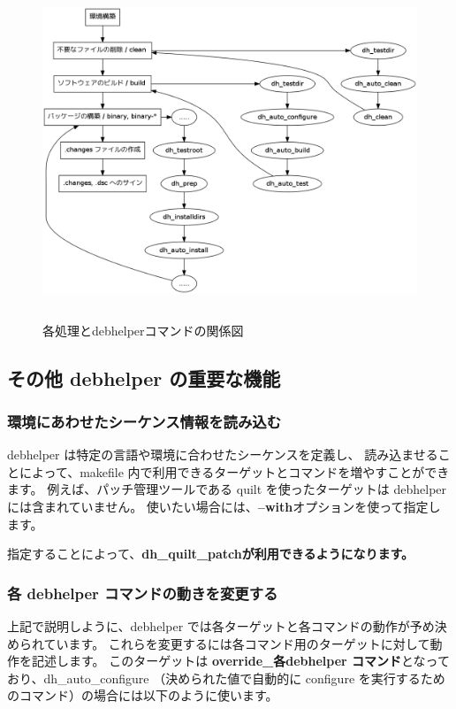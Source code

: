 \documentclass[mingoth,a4paper]{jsarticle}
\begin{document}
\begin{figure}[ht]
  \begin{center}
    \includegraphics[height=10cm]{image201110/rules-work.png}
  \end{center}
  \label{fig:rules-work}\caption{各処理とdebhelperコマンドの関係図}
\end{figure}

\subsection{その他 debhelper の重要な機能}

\subsubsection{環境にあわせたシーケンス情報を読み込む}
debhelper は特定の言語や環境に合わせたシーケンスを定義し、
読み込ませることによって、makefile 内で利用できるターゲットとコマンドを増やすことができます。
例えば、パッチ管理ツールである quilt を使ったターゲットは debhelper には含まれていません。
使いたい場合には、{\bf --with}オプションを使って指定します。

指定することによって、\bf{dh\_quilt\_patch}が利用できるようになります。

\subsubsection{各 debhelper コマンドの動きを変更する}
上記で説明しように、debhelper では各ターゲットと各コマンドの動作が予め決められています。
これらを変更するには各コマンド用のターゲットに対して動作を記述します。
このターゲットは {\bf override\_各debhelper コマンド}となっており、dh\_auto\_configure
（決められた値で自動的に configure を実行するためのコマンド）の場合には以下のように使います。
\end{document}
